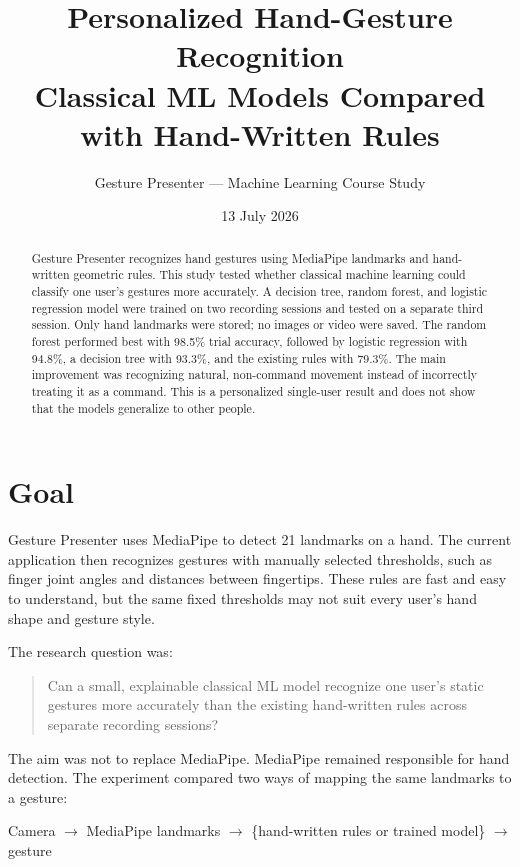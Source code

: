 \documentclass[11pt,a4paper]{article}
\title{Personalized Hand-Gesture Recognition\\
\large Classical ML Models Compared with Hand-Written Rules}
\author{Gesture Presenter --- Machine Learning Course Study}
\date{13 July 2026}
\begin{document}
\maketitle

\begin{abstract}
Gesture Presenter recognizes hand gestures using MediaPipe landmarks and
hand-written geometric rules. This study tested whether classical machine
learning could classify one user's gestures more accurately. A decision tree,
random forest, and logistic regression model were trained on two recording
sessions and tested on a separate third session. Only hand landmarks were
stored; no images or video were saved. The random forest performed best with
98.5\% trial accuracy, followed by logistic regression with 94.8\%, a decision
tree with 93.3\%, and the existing rules with 79.3\%. The main improvement was
recognizing natural, non-command movement instead of incorrectly treating it as
a command. This is a personalized single-user result and does not show that the
models generalize to other people.
\end{abstract}

\section{Goal}

Gesture Presenter uses MediaPipe to detect 21 landmarks on a hand. The current
application then recognizes gestures with manually selected thresholds, such as
finger joint angles and distances between fingertips. These rules are fast and
easy to understand, but the same fixed thresholds may not suit every user's hand
shape and gesture style.

The research question was:

\begin{quote}
Can a small, explainable classical ML model recognize one user's static gestures
more accurately than the existing hand-written rules across separate recording
sessions?
\end{quote}

The aim was not to replace MediaPipe. MediaPipe remained responsible for hand
detection. The experiment compared two ways of mapping the same landmarks to a
gesture:

\begin{center}
Camera $\rightarrow$ MediaPipe landmarks $\rightarrow$
\{hand-written rules or trained model\} $\rightarrow$ gesture
\end{center}
\end{document}
